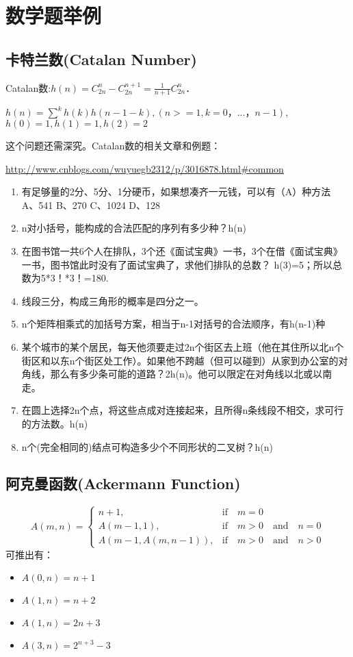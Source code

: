 \section{数学题举例}
\subsection{卡特兰数(Catalan Number)}

Catalan数:$h(n)=C_{2n}^{n} - C_{2n}^{n+1} = \frac{1}{n+1}C_{2n}^{n}$．

$h(n)=\sum^k{h(k)h(n-1-k)}, (n>=1,k=0，...，n-1)$, $h(0)=1, h(1)=1, h(2)=2$

这个问题还需深究。Catalan数的相关文章和例题：

\url{http://www.cnblogs.com/wuyuegb2312/p/3016878.html#common}

\begin{enumerate}
  \item 有足够量的2分、5分、1分硬币，如果想凑齐一元钱，可以有（A）种方法
A、541    B、270   C、1024    D、128
  \item n对小括号，能构成的合法匹配的序列有多少种？h(n)
  \item 在图书馆一共6个人在排队，3个还《面试宝典》一书，3个在借《面试宝典》一书，图书馆此时没有了面试宝典了，求他们排队的总数？
h(3)=5；所以总数为5*3！*3！=180.
	\item 线段三分，构成三角形的概率是四分之一。
	\item n个矩阵相乘式的加括号方案，相当于n-1对括号的合法顺序，有h(n-1)种
	\item 某个城市的某个居民，每天他须要走过2n个街区去上班（他在其住所以北n个街区和以东n个街区处工作）。如果他不跨越（但可以碰到）从家到办公室的对角线，那么有多少条可能的道路？2h(n)。他可以限定在对角线以北或以南走。
	\item 在圆上选择2n个点，将这些点成对连接起来，且所得n条线段不相交，求可行的方法数。h(n)
	\item n个(完全相同的)结点可构造多少个不同形状的二叉树？h(n)
\end{enumerate}

\subsection{阿克曼函数(Ackermann Function)}

 \begin{equation}
   A(m,n) = 
\left\{ \begin{array}{ll}
n+1, & \mathrm{if} \quad m=0\\
A(m-1,1), & \mathrm{if} \quad m>0 \quad \mathrm{and} \quad n=0\\
A(m-1,A(m,n-1)), & \mathrm{if} \quad m>0 \quad \mathrm{and} \quad n>0
\end{array} \right. 
 \label{FormulaAckermann}
 \end{equation}
可推出有：
\begin{itemize}
\item $A(0,n)=n+1$
\item $A(1,n)=n+2$
\item $A(1,n)=2 n+3$
\item $A(3,n)=2^{n+3}-3$
\end{itemize}



